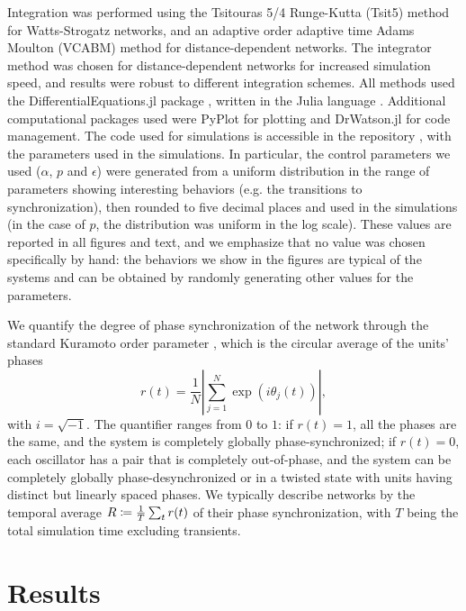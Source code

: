 Integration was performed using the Tsitouras 5/4 Runge-Kutta (Tsit5) method for Watts-Strogatz networks, and an adaptive order adaptive time Adams Moulton (VCABM) method for distance-dependent networks. The integrator method was chosen for distance-dependent networks for increased simulation speed, and results were robust to different integration schemes. All methods used the DifferentialEquations.jl package \cite{rackauckas2016differential}, written in the Julia language \cite{bezanson2017julia}. Additional computational packages used were PyPlot \cite{hunter2007matplotlib} for plotting and DrWatson.jl \cite{datseris2020drwatson} for code management. The code used for simulations is accessible in the repository \cite{rossi2022github}, with the parameters used in the simulations. In particular, the control parameters we used ($\alpha$, $p$ and $\epsilon$) were generated from a uniform distribution in the range of parameters showing interesting behaviors (e.g. the transitions to synchronization), then rounded to five decimal places and used in the simulations (in the case of $p$, the distribution was uniform in the log scale). These values are reported in all figures and text, and we emphasize that no value was chosen specifically by hand: the behaviors we show in the figures are typical of the systems and can be obtained by randomly generating other values for the parameters.

We quantify the degree of phase synchronization of the network through the standard Kuramoto order parameter \cite{kuramoto1975self, kuramoto1984chemical, acebron2005kuramoto}, which is the circular average of the units' phases 
%
\begin{equation}
    r(t) = \frac{1}{N}\left|\sum\limits_{j=1}^N \exp{(i \theta_j(t))}\right|,
\end{equation} 
with $i = \sqrt{-1}$. The quantifier ranges from $0$ to $1$: if $r(t) = 1$, all the phases are the same, and the system is completely globally phase-synchronized; if $r(t) = 0$, each oscillator has a pair that is completely out-of-phase, and the system can be completely globally phase-desynchronized or in a twisted state with units having distinct but linearly spaced phases. We typically describe networks by the temporal average $R \coloneqq \frac{1}{T} \sum_t r(t)$  of their phase synchronization, with $T$ being the total simulation time excluding transients.


\section{Results}\label{sec:results}

